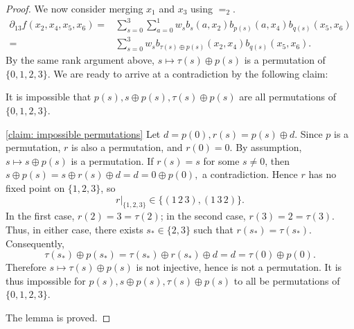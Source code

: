 \begin{proof}
    We now consider merging $x_1$ and $x_3$ using $=_2.$
    \begin{equation}\label{eq: merge 13}
        \begin{aligned}
            \partial_{13}f(x_2,x_4,x_5,x_6)
            =&\sum_{s=0}^3\sum_{a=0}^1 w_sb_s(a,x_2)b_{p(s)}(a,x_4)b_{q(s)}(x_5,x_6)\\
            =&\sum_{s=0}^3w_sb_{\tau(s)\oplus p(s)}(x_2,x_4)b_{q(s)}(x_5,x_6).
        \end{aligned}
    \end{equation}
    By the same rank argument above, $s\mapsto \tau(s)\oplus p(s)$ is a permutation of $\{0,1,2,3\}.$
    We are ready to arrive at a contradiction by the following claim:
    \begin{claim}\label{claim: impossible permutations}
        It is impossible that $p(s),s\oplus p(s),\tau(s)\oplus p(s)$ are all permutations of $\{0,1,2,3\}.$
    \end{claim}
    \begin{claimproof}{\cref{claim: impossible permutations}}
        Let
        $
        d=p(0), r(s)=p(s)\oplus d.
        $
        Since $p$ is a permutation, $r$ is also a
        permutation, and $r(0)=0$.
        By assumption, $s\mapsto s\oplus p(s)$ is a permutation. 
        If $r(s)=s$ for some $s\neq0$, then
        $
        s\oplus p(s)=s\oplus r(s)\oplus d=d=0\oplus p(0),
        $
        a contradiction. 
        Hence $r$ has no fixed point on $\{1,2,3\}$, so
        \[
        r|_{\{1,2,3\}}\in\{(1\,2\,3),(1\,3\,2)\}.
        \]
        In the first case, $r(2)=3=\tau(2)$; in the second case,
        $r(3)=2=\tau(3)$. Thus, in either case, there exists
        $s_*\in\{2,3\}$ such that $r(s_*)=\tau(s_*)$. Consequently,
        \[
        \tau(s_*)\oplus p(s_*)
         =\tau(s_*)\oplus r(s_*)\oplus d
         =d
         =\tau(0)\oplus p(0).
        \]
        Therefore $s\mapsto\tau(s)\oplus p(s)$ is not injective, hence is not
        a permutation. It is thus impossible for
        $
        p(s), s\oplus p(s), \tau(s)\oplus p(s)
        $
        to all be permutations of $\{0,1,2,3\}$.
    \end{claimproof}
    The lemma is proved.
\end{proof}


